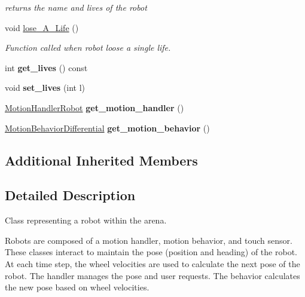 \begin{DoxyCompactItemize}
\begin{DoxyCompactList}\small\item\em returns the name and lives of the robot \end{DoxyCompactList}\item 
void \hyperlink{classRobot_ae0a3474ce96a7edee32f1b6597308d80}{lose\+\_\+\+A\+\_\+\+Life} ()\hypertarget{classRobot_ae0a3474ce96a7edee32f1b6597308d80}{}\label{classRobot_ae0a3474ce96a7edee32f1b6597308d80}

\begin{DoxyCompactList}\small\item\em Function called when robot loose a single life. \end{DoxyCompactList}\item 
int {\bfseries get\+\_\+lives} () const \hypertarget{classRobot_a201302eeb10756e9f9a54de414efef08}{}\label{classRobot_a201302eeb10756e9f9a54de414efef08}

\item 
void {\bfseries set\+\_\+lives} (int l)\hypertarget{classRobot_a8823c73b258afe8cf8ef276e8f2f9aab}{}\label{classRobot_a8823c73b258afe8cf8ef276e8f2f9aab}

\item 
\hyperlink{classMotionHandlerRobot}{Motion\+Handler\+Robot} {\bfseries get\+\_\+motion\+\_\+handler} ()\hypertarget{classRobot_a77d37cf0058d18b7f633202e8c1bf814}{}\label{classRobot_a77d37cf0058d18b7f633202e8c1bf814}

\item 
\hyperlink{classMotionBehaviorDifferential}{Motion\+Behavior\+Differential} {\bfseries get\+\_\+motion\+\_\+behavior} ()\hypertarget{classRobot_ab45bf3c6fdafcd14cdbdb2a8e3f558b8}{}\label{classRobot_ab45bf3c6fdafcd14cdbdb2a8e3f558b8}

\end{DoxyCompactItemize}
\subsection*{Additional Inherited Members}


\subsection{Detailed Description}
Class representing a robot within the arena. 

Robots are composed of a motion handler, motion behavior, and touch sensor. These classes interact to maintain the pose (position and heading) of the robot. At each time step, the wheel velocities are used to calculate the next pose of the robot. The handler manages the pose and user requests. The behavior calculates the new pose based on wheel velocities.

